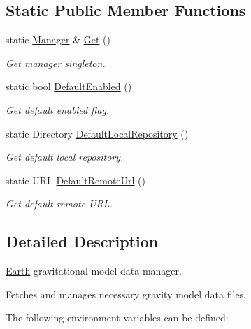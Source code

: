 \subsection*{Static Public Member Functions}
\begin{DoxyCompactItemize}
\item 
static \hyperlink{classlibrary_1_1physics_1_1environment_1_1gravitational_1_1earth_1_1_manager}{Manager} \& \hyperlink{classlibrary_1_1physics_1_1environment_1_1gravitational_1_1earth_1_1_manager_a17dbce5f18754f96fc83819d8e209884}{Get} ()
\begin{DoxyCompactList}\small\item\em Get manager singleton. \end{DoxyCompactList}\item 
static bool \hyperlink{classlibrary_1_1physics_1_1environment_1_1gravitational_1_1earth_1_1_manager_acb872a61352f52aaa09f41f3f7d0bd48}{Default\+Enabled} ()
\begin{DoxyCompactList}\small\item\em Get default enabled flag. \end{DoxyCompactList}\item 
static Directory \hyperlink{classlibrary_1_1physics_1_1environment_1_1gravitational_1_1earth_1_1_manager_a7ec5d0629aca85ecc4f3a49dc15cf861}{Default\+Local\+Repository} ()
\begin{DoxyCompactList}\small\item\em Get default local repository. \end{DoxyCompactList}\item 
static U\+RL \hyperlink{classlibrary_1_1physics_1_1environment_1_1gravitational_1_1earth_1_1_manager_a3607f55dff9310917a9036ee107be14e}{Default\+Remote\+Url} ()
\begin{DoxyCompactList}\small\item\em Get default remote U\+RL. \end{DoxyCompactList}\end{DoxyCompactItemize}


\subsection{Detailed Description}
\hyperlink{classlibrary_1_1physics_1_1environment_1_1gravitational_1_1_earth}{Earth} gravitational model data manager. 

Fetches and manages necessary gravity model data files.

The following environment variables can be defined\+:


